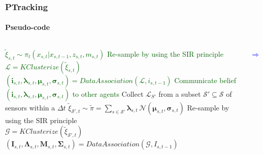 \begin{frame}
	\frametitle{PTracking}
	\framesubtitle{Pseudo-code}
	
	\begin{columns}[T]
		
		
		{
			\begin{algorithm}[H]
				\tiny
				\BlankLine
				\BlankLine
				\BlankLine
				\Begin
				{
					\textcolor{darkgreen}{$ \tilde{\xi}_{s,t} \sim \pi_t (x_{s,t} | x_{s,t-1},z_{s,t},m_{s,t}) $}
					\BlankLine
					\textcolor{darkgreen}{Re-sample by using the SIR principle}\\
					\BlankLine
					\textcolor{darkgreen}{$ \mathcal{L} = KClusterize(\tilde{\xi}_{s,t}) $}
					\BlankLine
					\textcolor{darkgreen}{$ (\boldsymbol{i}_{s,t},\boldsymbol\lambda_{s,t},\boldsymbol\mu_{s,t},\boldsymbol\sigma_{s,t}) = DataAssociation(\mathcal{L}, i_{s,t-1}) $}
					\BlankLine
					\textcolor{darkgreen}{Communicate belief $ (\boldsymbol{i}_{s,t},\boldsymbol\lambda_{s,t},\boldsymbol\mu_{s,t},\boldsymbol\sigma_{s,t}) $ to other agents}
				}
				\BlankLine
				\Begin
				{
					Collect $ \mathcal{L}_{S'} $ from a subset $ \mathcal{S'} \subseteq \mathcal{S} $ of sensors within a $ \Delta t $
					\BlankLine
					$ \tilde{\xi}_{\mathcal{S'},t} \sim \tilde\pi = \sum_{s \in \mathcal{S'}} \boldsymbol\lambda_{s,t} \, \mathcal{N} (\boldsymbol\mu_{s,t},\boldsymbol\sigma_{s,t}) $
					\BlankLine
					Re-sample by using the SIR principle\\
					\BlankLine
					$ \mathcal{G} = KClusterize(\tilde\xi_{{\mathcal{S'},t}}) $
					\BlankLine
					$ (\boldsymbol{I}_{s,t},\boldsymbol\Lambda_{s,t},\boldsymbol{M}_{s,t},\boldsymbol\Sigma_{s,t}) = DataAssociation(\mathcal{G},I_{s,t-1}) $
				}
			\end{algorithm}
			
			
			\Huge
			\vspace{2.15cm}
			
			\begin{center}
				\textcolor{blue}{$ \Rightarrow $}
			\end{center}
			
}
\end{columns}
\end{frame}
